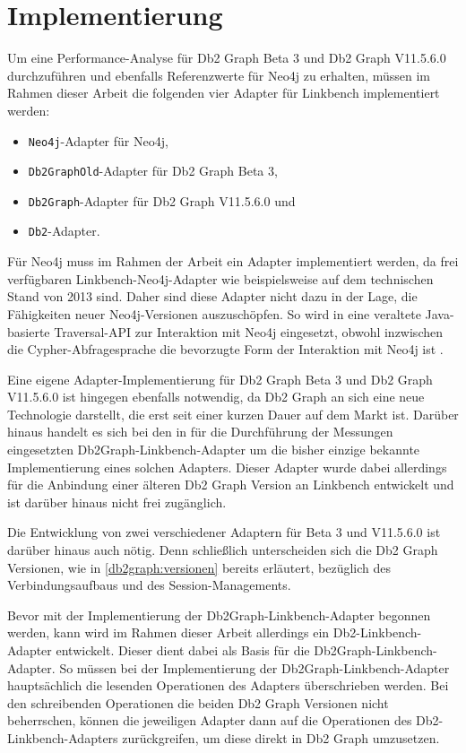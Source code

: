 \section{Implementierung}
\label{analyse:Implementierung}
Um eine Performance-Analyse für Db2 Graph Beta 3 und Db2 Graph V11.5.6.0 durchzuführen und ebenfalls Referenzwerte für Neo4j zu erhalten, müssen im Rahmen dieser Arbeit die folgenden vier Adapter für Linkbench implementiert werden:
\begin{itemize}
    \item \texttt{Neo4j}-Adapter für Neo4j,
    \item \texttt{Db2GraphOld}-Adapter für Db2 Graph Beta 3, 
    \item \texttt{Db2Graph}-Adapter für Db2 Graph V11.5.6.0 und
    \item \texttt{Db2}-Adapter.
\end{itemize}

Für Neo4j muss im Rahmen der Arbeit ein Adapter implementiert werden, da frei verfügbaren Linkbench-Neo4j-Adapter wie beispielsweise \cite{neo_linkbench_github} auf dem technischen Stand von 2013 sind. Daher sind diese Adapter nicht dazu in der Lage, die Fähigkeiten neuer Neo4j-Versionen auszuschöpfen. So wird in \cite{neo_linkbench_github} eine veraltete Java-basierte Traversal-API zur Interaktion mit Neo4j eingesetzt, obwohl inzwischen die Cypher-Abfragesprache die bevorzugte Form der Interaktion mit Neo4j ist \cite{gdbms}.

Eine eigene Adapter-Implementierung für Db2 Graph Beta 3 und Db2 Graph V11.5.6.0 ist hingegen ebenfalls notwendig, da Db2 Graph an sich eine neue Technologie darstellt, die erst seit einer kurzen Dauer auf dem Markt ist. Darüber hinaus handelt es sich bei den in \cite{sigmod_tian} für die Durchführung der Messungen eingesetzten Db2Graph-Linkbench-Adapter um die bisher einzige bekannte Implementierung eines solchen Adapters. Dieser Adapter wurde dabei allerdings für die Anbindung einer älteren Db2 Graph Version an Linkbench entwickelt und ist darüber hinaus nicht frei zugänglich.

Die Entwicklung von zwei verschiedener Adaptern für Beta 3 und V11.5.6.0 ist darüber hinaus auch nötig. Denn schließlich unterscheiden sich die Db2 Graph Versionen, wie in \autoref{db2graph:versionen} bereits erläutert, bezüglich des Verbindungsaufbaus und des Session-Managements. 

Bevor mit der Implementierung der Db2Graph-Linkbench-Adapter begonnen werden, kann wird im Rahmen dieser Arbeit allerdings ein Db2-Linkbench-Adapter entwickelt. Dieser dient dabei als Basis für die Db2Graph-Linkbench-Adapter. So müssen bei der Implementierung der Db2Graph-Linkbench-Adapter hauptsächlich die lesenden Operationen des Adapters überschrieben werden. Bei den schreibenden Operationen die beiden Db2 Graph Versionen nicht beherrschen, können die jeweiligen Adapter dann auf die Operationen des Db2-Linkbench-Adapters zurückgreifen, um diese direkt in Db2 Graph umzusetzen.

